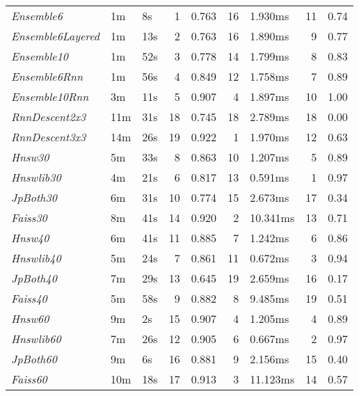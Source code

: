 \begin{tabular}{lllrrrlrl}
\toprule
\midrule
\emph{Ensemble6} & 1m & 8s & 1 & 0.763 & 16 & 1.930ms & 11 & 0.74 \\
\emph{Ensemble6Layered} & 1m & 13s & 2 & 0.763 & 16 & 1.890ms & 9 & 0.77 \\
\emph{Ensemble10} & 1m & 52s & 3 & 0.778 & 14 & 1.799ms & 8 & 0.83 \\
\emph{Ensemble6Rnn} & 1m & 56s & 4 & 0.849 & 12 & 1.758ms & 7 & 0.89 \\
\emph{Ensemble10Rnn} & 3m & 11s & 5 & 0.907 & 4 & 1.897ms & 10 & 1.00 \\
\emph{RnnDescent2x3} & 11m & 31s & 18 & 0.745 & 18 & 2.789ms & 18 & 0.00 \\
\emph{RnnDescent3x3} & 14m & 26s & 19 & 0.922 & 1 & 1.970ms & 12 & 0.63 \\
\emph{Hnsw30} & 5m & 33s & 8 & 0.863 & 10 & 1.207ms & 5 & 0.89 \\
\emph{Hnswlib30} & 4m & 21s & 6 & 0.817 & 13 & 0.591ms & 1 & 0.97 \\
\emph{JpBoth30} & 6m & 31s & 10 & 0.774 & 15 & 2.673ms & 17 & 0.34 \\
\emph{Faiss30} & 8m & 41s & 14 & 0.920 & 2 & 10.341ms & 13 & 0.71 \\
\emph{Hnsw40} & 6m & 41s & 11 & 0.885 & 7 & 1.242ms & 6 & 0.86 \\
\emph{Hnswlib40} & 5m & 24s & 7 & 0.861 & 11 & 0.672ms & 3 & 0.94 \\
\emph{JpBoth40} & 7m & 29s & 13 & 0.645 & 19 & 2.659ms & 16 & 0.17 \\
\emph{Faiss40} & 5m & 58s & 9 & 0.882 & 8 & 9.485ms & 19 & 0.51 \\
\emph{Hnsw60} & 9m & 2s & 15 & 0.907 & 4 & 1.205ms & 4 & 0.89 \\
\emph{Hnswlib60} & 7m & 26s & 12 & 0.905 & 6 & 0.667ms & 2 & 0.97 \\
\emph{JpBoth60} & 9m & 6s & 16 & 0.881 & 9 & 2.156ms & 15 & 0.40 \\
\emph{Faiss60} & 10m & 18s & 17 & 0.913 & 3 & 11.123ms & 14 & 0.57 \\
\bottomrule
\end{tabular}
